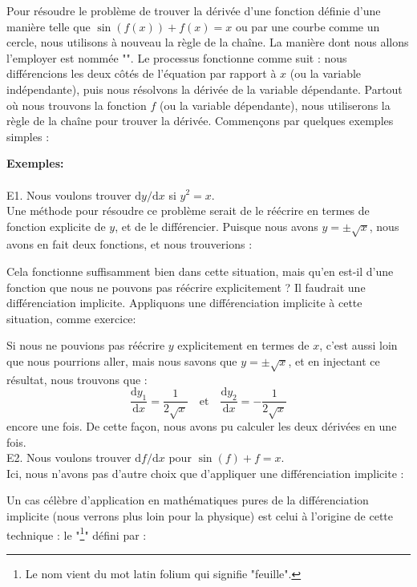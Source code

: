 	Pour résoudre le problème de trouver la dérivée d'une fonction définie d'une manière telle que $\sin(f(x)) + f(x) = x$ ou par une courbe comme un cercle, nous utilisons à nouveau la règle de la chaîne. La manière dont nous allons l'employer est nommée "". Le processus fonctionne comme suit : nous différencions les deux côtés de l'équation par rapport à $x$ (ou la variable indépendante), puis nous résolvons la dérivée de la variable dépendante. Partout où nous trouvons la fonction $f$ (ou la variable dépendante), nous utiliserons la règle de la chaîne pour trouver la dérivée. Commençons par quelques exemples simples :
	
	\begin{tcolorbox}[colframe=black,colback=white,sharp corners]
	\textbf{{\Large {}}Exemples:}\\\\
	E1. Nous voulons trouver $\mathrm{d}y/\mathrm{d}x$ si $y^2 = x$.\\
	
	Une méthode pour résoudre ce problème serait de le réécrire en termes de fonction explicite de $y$, et de le différencier. Puisque nous avons $y = \pm \sqrt{x}$, nous avons en fait deux fonctions, et nous trouverions :
	
	Cela fonctionne suffisamment bien dans cette situation, mais qu'en est-il d'une fonction que nous ne pouvons pas réécrire explicitement ? Il faudrait une différenciation implicite. Appliquons une différenciation implicite à cette situation, comme exercice: 
	
	Si nous ne pouvions pas réécrire $y$ explicitement en termes de $x$, c'est aussi loin que nous pourrions aller, mais nous savons que $y = \pm \sqrt{x}$, et en injectant ce résultat, nous trouvons que :
	$$\frac{\mathrm{d}y_1}{\mathrm{d}x} = \frac{1}{2\sqrt{x}} \quad \text{et} \quad \frac{\mathrm{d}y_2}{\mathrm{d}x} = -\frac{1}{2\sqrt{x}}$$
	encore une fois. De cette façon, nous avons pu calculer les deux dérivées en une fois.\\
	
	E2. Nous voulons trouver $\mathrm{d}f/\mathrm{d}x$ pour $\sin(f) + f = x$.\\
	
	Ici, nous n'avons pas d'autre choix que d'appliquer une différenciation implicite :
	
	\end{tcolorbox}
	Un cas célèbre d'application en mathématiques pures de la différenciation implicite (nous verrons plus loin pour la physique) est celui à l'origine de cette technique : le "\footnote{Le nom vient du mot latin folium qui signifie "feuille".}" défini par :
	
